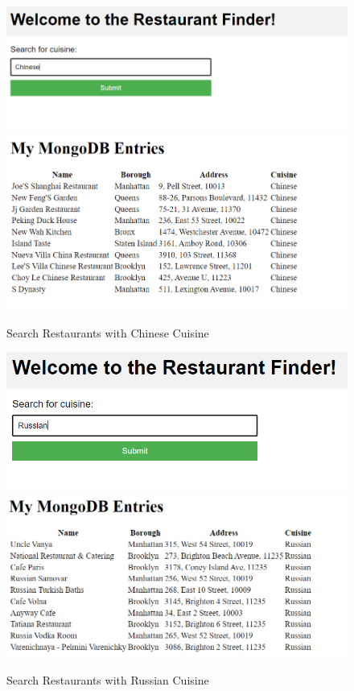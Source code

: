 \documentclass[12pt]{article}
\begin{document}
\begin{figure}[h!]
    \centering
    \includegraphics[scale = 0.4]{images/ChineseQ.png}
    \includegraphics[scale = 0.4]{images/ChineseList.png}
    \caption{Search Restaurants with Chinese Cuisine}
\end{figure}

\begin{figure}[h!]
    \centering
    \includegraphics[scale = 0.6]{images/RussianQ.png}
    \includegraphics[scale = 0.6]{images/RussianList.png}
    \caption{Search Restaurants with Russian Cuisine}
\end{figure}
\pagebreak
\end{document}
